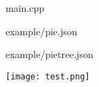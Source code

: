 \documentclass{article}
\begin{document}

    {main.cpp}

    {example/pie.json}

    {example/pietree.json}


\begin{center}
\texttt{[image: test.png]}
\end{center}
\end{document}
